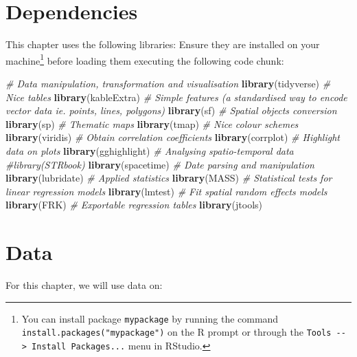 \documentclass[
]{book}
\newenvironment{Shaded}{\begin{snugshade}}{\end{snugshade}}
\newcommand{\CommentTok}[1]{\textcolor[rgb]{0.56,0.35,0.01}{\textit{#1}}}
\newcommand{\KeywordTok}[1]{\textcolor[rgb]{0.13,0.29,0.53}{\textbf{#1}}}
\newcommand{\NormalTok}[1]{#1}
\begin{document}
\hypertarget{dependencies-7}{%
\section{Dependencies}\label{dependencies-7}}

This chapter uses the following libraries: Ensure they are installed on your machine\footnote{You can install package \texttt{mypackage} by running the command \texttt{install.packages("mypackage")} on the R prompt or through the \texttt{Tools\ -\/-\textgreater{}\ Install\ Packages...} menu in RStudio.} before loading them executing the following code chunk:

\begin{Shaded}
\begin{Highlighting}[]
\CommentTok{# Data manipulation, transformation and visualisation}
\KeywordTok{library}\NormalTok{(tidyverse)}
\CommentTok{# Nice tables}
\KeywordTok{library}\NormalTok{(kableExtra)}
\CommentTok{# Simple features (a standardised way to encode vector data ie. points, lines, polygons)}
\KeywordTok{library}\NormalTok{(sf) }
\CommentTok{# Spatial objects conversion}
\KeywordTok{library}\NormalTok{(sp) }
\CommentTok{# Thematic maps}
\KeywordTok{library}\NormalTok{(tmap) }
\CommentTok{# Nice colour schemes}
\KeywordTok{library}\NormalTok{(viridis) }
\CommentTok{# Obtain correlation coefficients}
\KeywordTok{library}\NormalTok{(corrplot)}
\CommentTok{# Highlight data on plots}
\KeywordTok{library}\NormalTok{(gghighlight)}
\CommentTok{# Analysing spatio-temporal data}
\CommentTok{#library(STRbook)}
\KeywordTok{library}\NormalTok{(spacetime)}
\CommentTok{# Date parsing and manipulation}
\KeywordTok{library}\NormalTok{(lubridate)}
\CommentTok{# Applied statistics}
\KeywordTok{library}\NormalTok{(MASS)}
\CommentTok{# Statistical tests for linear regression models}
\KeywordTok{library}\NormalTok{(lmtest)}
\CommentTok{# Fit spatial random effects models}
\KeywordTok{library}\NormalTok{(FRK)}
\CommentTok{# Exportable regression tables}
\KeywordTok{library}\NormalTok{(jtools)}
\end{Highlighting}
\end{Shaded}

\hypertarget{data-6}{%
\section{Data}\label{data-6}}

For this chapter, we will use data on:
\end{document}

